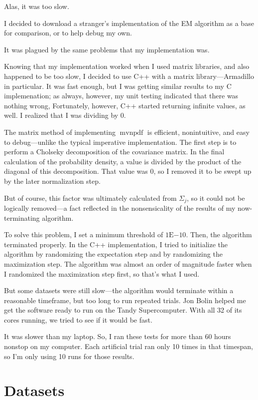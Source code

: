 \documentclass{journal}
\DeclareMathOperator{\mvnpdf}{mvnpdf}
\begin{document}
Alas, it was too slow.

I decided to download a stranger's implementation of the EM algorithm as a base
for comparison, or to help debug my own.

It was plagued by the same problems that my implementation was.

Knowing that my implementation worked when I used matrix libraries, and also
happened to be too slow, I decided to use C++ with a matrix library---Armadillo
in particular. It was fast enough, but I was getting similar results to my C
implemenation; as always, however, my unit testing indicated that there was
nothing wrong, Fortunately, however, C++ started returning infinite values, as
well. I realized that I was dividing by 0.

The matrix method of implementing $\mvnpdf{}$ is efficient, nonintuitive, and
easy to debug---unlike the typical imperative implementation. The
first step is to perform a Cholseky decomposition of the covariance matrix.
In the final calculation of the probability density, a value is divided by
the product of the diagonal of this decomposition. That value was 0, so I
removed it to be swept up by the later normalization step.

But of course, this factor was ultimately calculated from $\Sigma_{j}$, so it
could not be logically removed---a fact reflected in the nonsensicality of the
results of my now-terminating algorithm.

To solve this problem, I set a minimum threshold of $1\mathrm{E}{-10}$. Then,
the algorithm
terminated properly. In the C++ implementation, I tried to initialize the
algorithm by randomizing the expectation step and by randomizing the
maximization step. The algorithm was almost an order of magnitude faster when I
randomized the maximization step first, so that's what I used.

But some datasets were still slow---the algorithm would terminate within a
reasonable timeframe, but too long to run repeated trials. Jon Bolin helped me
get the software ready to run on the Tandy Supercomputer. With all 32 of its
cores running, we tried to see if it would be fast.

It was slower than my laptop. So, I ran these tests for more than 60
hours nonstop on my computer. Each artificial trial ran only 10 times in that
timespan, so I'm only using 10 runs for those results.

\section{Datasets}
\end{document}
